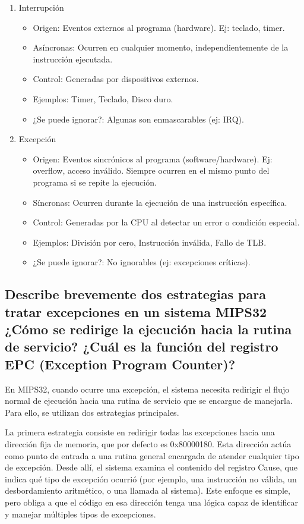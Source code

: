 \documentclass{article}
\begin{document}
\begin{enumerate}
\item Interrupción
\begin{itemize}
\item Origen: Eventos externos al programa (hardware). Ej: teclado, timer.
\item Asíncronas: Ocurren en cualquier momento, independientemente de la instrucción ejecutada.
\item Control: Generadas por dispositivos externos.
\item Ejemplos: Timer, Teclado, Disco duro.
\item ¿Se puede ignorar?: Algunas son enmascarables (ej: IRQ).
\end{itemize}
\item Excepción
\begin{itemize}
\item Origen: Eventos sincrónicos al programa (software/hardware). Ej: overflow, acceso inválido. Siempre ocurren en el mismo punto del programa si se repite la ejecución.
\item Síncronas: Ocurren durante la ejecución de una instrucción específica.
\item Control: Generadas por la CPU al detectar un error o condición especial.
\item Ejemplos: División por cero, Instrucción inválida, Fallo de TLB.
\item ¿Se puede ignorar?: No ignorables (ej: excepciones críticas).
\end{itemize}
\end{enumerate}

\subsection{Describe brevemente dos estrategias para tratar excepciones en un sistema MIPS32 ¿Cómo se redirige la ejecución hacia la rutina de servicio? ¿Cuál es la función del registro EPC (Exception Program Counter)? }

En MIPS32, cuando ocurre una excepción, el sistema necesita redirigir el flujo normal de ejecución hacia una rutina de servicio que se encargue de manejarla. Para ello, se utilizan dos estrategias principales.\newline

La primera estrategia consiste en redirigir todas las excepciones hacia una dirección fija de memoria, que por defecto es 0x80000180. Esta dirección actúa como punto de entrada a una rutina general encargada de atender cualquier tipo de excepción. Desde allí, el sistema examina el contenido del registro Cause, que indica qué tipo de excepción ocurrió (por ejemplo, una instrucción no válida, un desbordamiento aritmético, o una llamada al sistema). Este enfoque es simple, pero obliga a que el código en esa dirección tenga una lógica capaz de identificar y manejar múltiples tipos de excepciones.\newline
\end{document}
